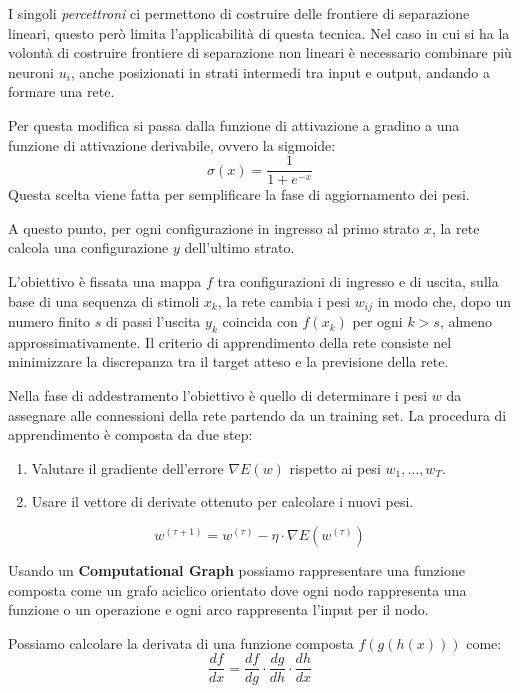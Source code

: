 I singoli \textit{percettroni} ci permettono di costruire delle frontiere di
separazione lineari, questo però limita l'applicabilità di questa tecnica. Nel
caso in cui si ha la volontà di costruire frontiere di separazione non lineari è
necessario combinare più neuroni $u_i$, anche posizionati in strati intermedi tra
input e output, andando a formare una rete.

Per questa modifica si passa dalla funzione di attivazione a gradino a una funzione
di attivazione derivabile, ovvero la sigmoide:
\begin{equation}
    \sigma(x) = \frac{1}{1 + e^{-x}}
\end{equation}
Questa scelta viene fatta per semplificare la fase di aggiornamento dei pesi.

A questo punto, per ogni configurazione in ingresso al primo strato $x$, la rete
calcola una configurazione $y$ dell'ultimo strato.

L'obiettivo è fissata una mappa $f$ tra configurazioni di ingresso e di uscita,
sulla base di una sequenza di stimoli $x_k$, la rete cambia i pesi $w_{ij}$ in
modo che, dopo un numero finito $s$ di passi l'uscita $y_k$ coincida con $f(x_k)$
per ogni $k > s$, almeno approssimativamente. Il criterio di apprendimento della
rete consiste nel minimizzare la discrepanza tra il target atteso e la previsione della rete.

Nella fase di addestramento l'obiettivo è quello di determinare i pesi $w$ da
assegnare alle connessioni della rete partendo da un training set. La procedura di
apprendimento è composta da due step:
\begin{enumerate}
    \item Valutare il gradiente dell'errore $\nabla E(w)$ rispetto ai pesi $w_1, \dots, w_T$.
    \item Usare il vettore di derivate ottenuto per calcolare i nuovi pesi.
\end{enumerate}
\begin{equation}
    w^{(\tau + 1)} = w^{(\tau)} - \eta \cdot \nabla E(w^{(\tau)})
\end{equation}

Usando un \textbf{Computational Graph} possiamo rappresentare una funzione composta
come un grafo aciclico orientato dove ogni nodo rappresenta una funzione o un
operazione e ogni arco rappresenta l'input per il nodo.

Possiamo calcolare la derivata di una funzione composta $f(g(h(x)))$ come:
\begin{equation}
    \frac{df}{dx} = \frac{df}{dg} \cdot \frac{dg}{dh} \cdot \frac{dh}{dx}
\end{equation}

